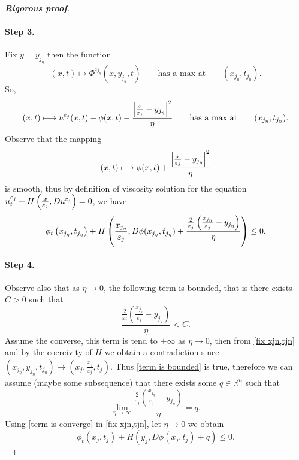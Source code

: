 \documentclass[12pt, oneside]{amsart}  	%
\begin{document}
\begin{proof}[\textbf{Rigorous proof}]
\paragraph{\textbf{Step 3.}} Fix $y=y_{j_\eta}$ then the function
\begin{equation*}
(x,t)\mapsto \Phi^{\varepsilon_{j_\eta}}\left(x, y_{j_\eta}, t\right)\qquad\text{has a max at}\qquad \left(x_{j_\eta}, t_{j_\eta}\right).
\end{equation*}
So,
\begin{equation*}
(x,t)\longmapsto u^{\varepsilon_j}(x,t) - \phi(x,t) - \frac{\left|\frac{x}{\varepsilon_j} - y_{j_\eta}\right|^2}{\eta}\qquad \text{has a max at}\qquad (x_{j_\eta}, t_{j_\eta}).
\end{equation*}
Observe that the mapping
\begin{equation*}
(x,t)\longmapsto  \phi(x,t) + \frac{\left|\frac{x}{\varepsilon_j} - y_{j_\eta}\right|^2}{\eta}
\end{equation*}
is smooth, thus by definition of viscosity solution for the equation $u^{\varepsilon_j}_t + H\left(\frac{x}{\varepsilon_j}, Du^{\varepsilon_j}\right)=0$, we have
\begin{equation}\label{fix xjn,tjn}
\phi_t\left(x_{j_\eta}, t_{j_\eta}\right)+ H\left(\frac{x_{j_\eta}}{\varepsilon_j}, D\phi(x_{j_\eta}, t_{j_\eta})+ \frac{\frac{2}{\varepsilon_j}\left(\frac{x_{j_\eta}}{\varepsilon_j} - y_{j_\eta}\right)}{\eta}\right)\le 0.
\end{equation}
\vspace*{0.2cm}


\paragraph{\textbf{Step 4.}} Observe also that as $\eta \longrightarrow 0$, the following term is bounded, that is there exists $C>0$ such that
\begin{equation}\label{term is bounded}
\frac{\frac{2}{\varepsilon_j} \left( \frac{x_{j_\eta}}{\varepsilon_j} - y_{j_\eta} \right)}{\eta} < C.
\end{equation}
Assume the converse, this term is tend to $+\infty$ as $\eta\longrightarrow 0$, then from \eqref{fix xjn,tjn} and by the coercivity of $H$ we obtain a contradiction since $(x_{j_\eta},y_{j_\eta},t_{j_\eta}) \longrightarrow \left(x_j,\frac{x_j}{\varepsilon_j},t_j\right)$. Thus \eqref{term is bounded} is true, therefore we can assume (maybe some subsequence) that there exists some $q\in \mathbb{R}^n$ such that
\begin{equation}\label{term is converge}
\lim_{\eta\longrightarrow\infty}\frac{\frac{2}{\varepsilon_j} \left( \frac{x_{j_\eta}}{\varepsilon_j} - y_{j_\eta} \right)}{\eta} =q.
\end{equation}
Using \eqref{term is converge} in \eqref{fix xjn,tjn}, let $\eta\longrightarrow0$ we obtain
\begin{equation}\label{first-equation}
\phi_t(x_j,t_j) + H\left(y_j, D\phi\left(x_j,t_j\right) + q\right) \leq 0.
\end{equation}
\vspace*{0.2cm}






\end{proof}
\end{document}
